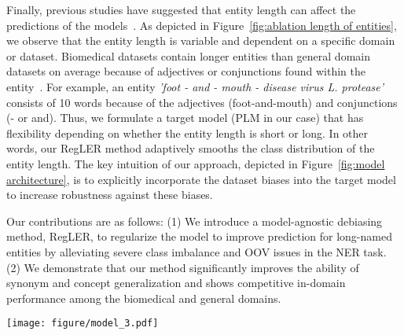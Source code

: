 \documentclass[11pt]{article}
\begin{document}
Finally, previous studies have suggested that entity length can affect the predictions of the models~\cite{fu2020rethinking, hong2020dtranner, wei2020multichannel}.
As depicted in Figure~\ref{fig:ablation length of entities}, we observe that the entity length is variable and dependent on a specific domain or dataset.
Biomedical datasets contain longer entities than general domain datasets on average because of  adjectives or conjunctions found within the entity~\cite{wei2020multichannel, cho2020combinatorial}.
For example, an entity \textit{'foot - and - mouth - disease virus L. protease'} consists of 10 words because of the adjectives (foot-and-mouth) and conjunctions (- or and).
Thus, we formulate a target model (PLM in our case) that has flexibility depending on whether the entity length is short or long.
In other words, our RegLER method adaptively smooths the class distribution of the entity length.
The key intuition of our approach, depicted in Figure~\ref{fig:model architecture}, is to explicitly incorporate the dataset biases into the target model to increase robustness against these biases.

Our contributions are as follows: 
(1) We introduce a model-agnostic debiasing method, RegLER, to regularize the model to improve prediction for long-named entities by alleviating severe class imbalance and OOV issues in the NER task.
(2) We demonstrate that our method significantly improves the ability of synonym and concept generalization and shows competitive in-domain performance among the biomedical and general domains.


\begin{figure*}[t]
 \centering
 \texttt{[image: figure/model\_3.pdf]}
 \caption{The overview of RegLER. (a) PMI reflects a solution of class imbalance, and the subword frequency solves an out-of-vocabulary (OOV) issue. For example, we depict the OOV issue with the word \textit{Latent} that does not appear in the training dataset but occurs in the test dataset. 
 We designed a class prior to reflecting the class imbalance inherent in the NER task. (b) We substitute a bias-only model with PMI statistic.
 For example, the word \textit{disease} is mainly classified with an \textit{I} (or inside) label, but the class distribution focuses on an \textit{O} (or outside) label.
 Our bias-only model reduces the importance of the label \textit{I} by adding the PMI score to the logit value of the target model ($f_\theta$). 
 Subsequently, we use temperature scaling \protect\cite{guo2017calibration} to smooth the class distribution of the normalized PMI depending on the entity length. The red line indicates that computing the PMI is only added during the training time.}
 \label{fig:model architecture}
\end{figure*}
\end{document}
